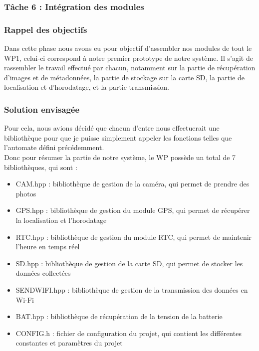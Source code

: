 \subsubsection{Tâche 6 : Intégration des modules}

\subsubsection*{Rappel des objectifs}

Dans cette phase nous avons eu pour objectif d'assembler nos modules de tout le WP1, celui-ci correspond à notre premier prototype de notre système.
Il s'agit de rassembler le travail effectué par chacun, notamment sur la partie de récupération d'images et de métadonnées, 
la partie de stockage sur la carte SD, la partie de localisation et d'horodatage, et la partie transmission.
\\

\subsubsection*{Solution envisagée}

Pour cela, nous avions décidé que chacun d'entre nous effectuerait une bibliothèque pour que je puisse simplement appeler les fonctions telles que 
l'automate défini précédemment. 
\\

Donc pour résumer la partie de notre système, le WP possède un total de 7 bibliothèques, qui sont :
\begin{itemize}
    \item CAM.hpp : bibliothèque de gestion de la caméra, qui permet de prendre des photos 
    \item GPS.hpp : bibliothèque de gestion du module GPS, qui permet de récupérer la localisation et l'horodatage
    \item RTC.hpp : bibliothèque de gestion du module RTC, qui permet de maintenir l'heure en temps réel
    \item SD.hpp : bibliothèque de gestion de la carte SD, qui permet de stocker les données collectées
    \item SENDWIFI.hpp : bibliothèque de gestion de la transmission des données en Wi-Fi
    \item BAT.hpp : bibliothèque de récupération de la tension de la batterie
    \item CONFIG.h : fichier de configuration du projet, qui contient les différentes constantes et paramètres du projet
    \\
\end{itemize}

